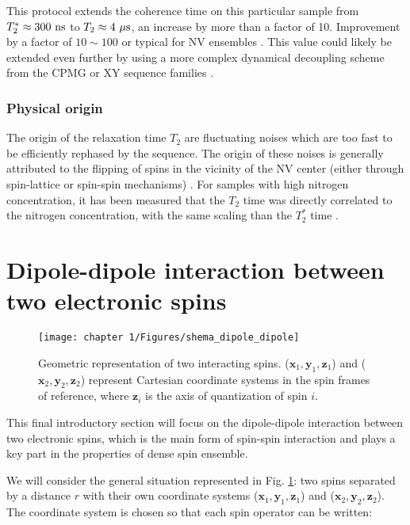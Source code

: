 \documentclass[a4paper,11pt]{report}
\begin{document}
\begin{refsection}
This protocol extends the coherence time on this particular sample from $T_2^* \approx 300\ \rm ns$ to $T_2 \approx 4\ \rm{\mu s}$, an increase by more than a factor of 10. Improvement by a factor of $10 \sim 100$ or typical for NV ensembles \citep{barry2020sensitivity}. This value could likely be extended even further by using a more complex dynamical decoupling scheme from the CPMG or XY sequence families \citep{naydenov2011dynamical, bar2012suppression}.

\subsubsection{Physical origin}
The origin of the relaxation time $T_2$ are fluctuating noises which are too fast to be efficiently rephased by the sequence. The origin of these noises is generally attributed to the flipping of spins in the vicinity of the NV center (either through spin-lattice or spin-spin mechanisms) \citep{hall2014analytic}. For samples with high nitrogen concentration, it has been measured that the $T_2$ time  was directly correlated to the nitrogen concentration, with the same scaling than the $T_2^*$ time \citep{bauch2019decoherence}.

\section{Dipole-dipole interaction between two electronic spins}

\begin{figure}[h!]
\centering
\texttt{[image: chapter 1/Figures/shema\_dipole\_dipole]}
\caption{Geometric representation of two interacting spins. ($\mathbf{x}_1,\mathbf{y}_1,\mathbf{z}_1$) and ($\mathbf{x}_2,\mathbf{y}_2,\mathbf{z}_2$) represent Cartesian coordinate systems in the spin frames of reference, where $\mathbf{z}_i$ is the axis of quantization of spin $i$.} 
\label{dipole-dipole}
\end{figure}

This final introductory section will focus on the dipole-dipole interaction between two electronic spins, which is the main form of spin-spin interaction and plays a key part in the properties of dense spin ensemble. 

We will consider the general situation represented in Fig. \ref{dipole-dipole}: two spins separated by a distance $r$ with their own coordinate systems ($\mathbf{x}_1,\mathbf{y}_1,\mathbf{z}_1$) and ($\mathbf{x}_2,\mathbf{y}_2,\mathbf{z}_2$). The coordinate system is chosen so that each spin operator can be written:


\end{refsection}
\end{document}
